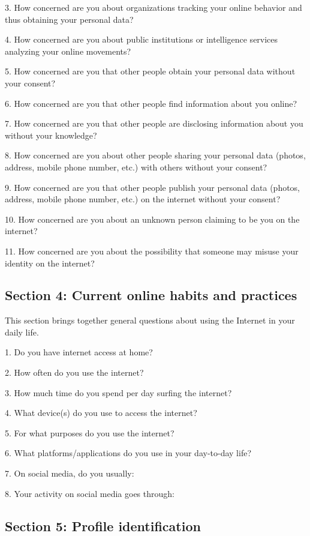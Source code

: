 3. How concerned are you about organizations tracking your online behavior and thus obtaining your personal data?

4. How concerned are you about public institutions or intelligence services analyzing your online movements?

5. How concerned are you that other people obtain your personal data without your consent?

6. How concerned are you that other people find information about you online?


7. How concerned are you that other people are disclosing information about you without your knowledge?

8. How concerned are you about other people sharing your personal data (photos, address, mobile phone number, etc.) with others without your consent?

9. How concerned are you that other people publish your personal data (photos, address, mobile phone number, etc.) on the internet without your consent?

10. How concerned are you about an unknown person claiming to be you on the internet?

11. How concerned are you about the possibility that someone may misuse your identity on the internet?

\subsection*{Section 4: Current online habits and practices}

This section brings together general questions about using the Internet in your daily life.


1. Do you have internet access at home?

2. How often do you use the internet?

3. How much time do you spend per day surfing the internet?

4. What device(s) do you use to access the internet?

5. For what purposes do you use the internet?

6. What platforms/applications do you use in your day-to-day life?

7. On social media, do you usually:

8. Your activity on social media goes through:

\subsection*{Section 5: Profile identification}

